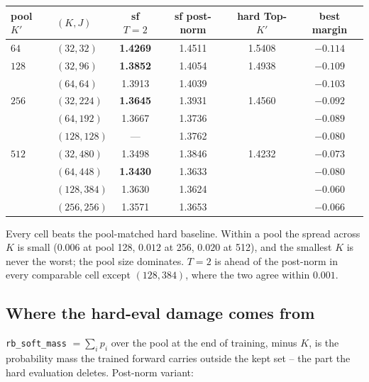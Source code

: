 \documentclass[11pt,a4paper]{article}
\newcommand{\code}[1]{\texttt{#1}}
\newcommand{\bst}[1]{\textbf{#1}}
\newcommand{\Kp}{K'}
\begin{document}
\begin{center}\small
\begin{tabular}{llcccc}
\toprule
pool $\Kp$ & $(K,J)$ & sf $T{=}2$ & sf post-norm & hard Top-$\Kp$ & best margin \\
\midrule
$64$  & $(32,32)$   & \bst{1.4269} & 1.4511 & 1.5408 & $-0.114$ \\
\midrule
$128$ & $(32,96)$   & \bst{1.3852} & 1.4054 & 1.4938 & $-0.109$ \\
      & $(64,64)$   & 1.3913 & 1.4039 & & $-0.103$ \\
\midrule
$256$ & $(32,224)$  & \bst{1.3645} & 1.3931 & 1.4560 & $-0.092$ \\
      & $(64,192)$  & 1.3667 & 1.3736 & & $-0.089$ \\
      & $(128,128)$ & --- & 1.3762 & & $-0.080$ \\
\midrule
$512$ & $(32,480)$  & 1.3498 & 1.3846 & 1.4232 & $-0.073$ \\
      & $(64,448)$  & \bst{1.3430} & 1.3633 & & $-0.080$ \\
      & $(128,384)$ & 1.3630 & 1.3624 & & $-0.060$ \\
      & $(256,256)$ & 1.3571 & 1.3653 & & $-0.066$ \\
\bottomrule
\end{tabular}
\end{center}

Every cell beats the pool-matched hard baseline. Within a pool the spread
across $K$ is small ($0.006$ at pool 128, $0.012$ at 256, $0.020$ at 512),
and the smallest $K$ is never the worst; the pool size dominates. $T=2$ is
ahead of the post-norm in every comparable cell except $(128,384)$, where the
two agree within $0.001$.

\subsection*{Where the hard-eval damage comes from}

\code{rb\_soft\_mass} $= \sum_i p_i$ over the pool at the end of training,
minus $K$, is the probability mass the trained forward carries outside the
kept set -- the part the hard evaluation deletes. Post-norm variant:
\end{document}
